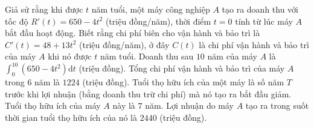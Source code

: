 \begin{ex}
Giả sử rằng khi được $t$ năm tuổi, một máy công nghiệp $A$ tạo ra doanh thu với tốc độ $R'(t)=650-4t^2$ (triệu đồng/năm), thời điểm $t=0$ tính từ lúc máy $A$ bắt đầu hoạt động. Biết rằng chi phí biên cho vận hành và bảo trì là $C'(t)=48+13t^2$ (triệu đồng/năm), ở đây $C(t)$ là chi phí vận hành và bảo trì của máy $A$ khi nó được $t$ năm tuổi.
\choiceTF
{\True Doanh thu sau $10$ năm của máy $A$ là $\displaystyle\int_0^{10}\left(650-4t^2\right)\mathrm dt$ (triệu đồng).}
{\True Tổng chi phí vận hành và bảo trì của máy $A$ trong $6$ năm là $1224$ (triệu đồng).}
{Tuổi thọ hữu ích của một máy là số năm $T$ trước khi lợi nhuận (bằng doanh thu trừ chi phí) mà nó tạo ra bắt đầu giảm. Tuổi thọ hữu ích của máy $A$ này là $7$ năm.}
{Lợi nhuận do máy $A$ tạo ra trong suốt thời gian tuổi thọ hữu ích của nó là $2440$ (triệu đồng).}
\end{ex}
